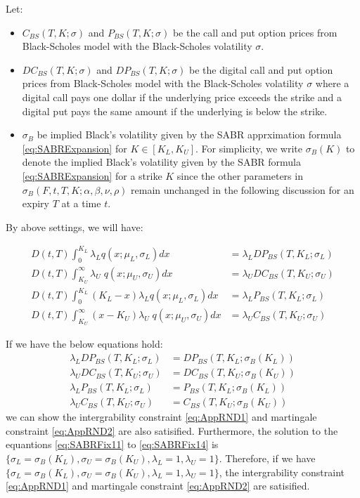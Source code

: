 \documentclass[letterpaper,12pt,titlepage,oneside,final]{book}
\numberwithin{equation}{section}
\theoremstyle{definition}
\begin{document}
Let:
\begin{itemize}
\item  $C_{BS}(T,K;\sigma)$ and $P_{BS}(T,K;\sigma)$ be the call and put option prices from Black-Scholes model with the Black-Scholes volatility $\sigma$.
\item  $DC_{BS}(T,K;\sigma)$ and $DP_{BS}(T,K;\sigma)$ be the digital call and put option prices from Black-Scholes model with the Black-Scholes  volatility $\sigma$  where a digital call pays one dollar if the underlying price exceeds the strike and a digital put pays the same amount  if the underlying is below the strike. 
\item  $\sigma_B$ be implied Black's volatility given by the SABR apprximation formula \eqref{eq:SABRExpansion} for $K \in [K_{L},K_{U}]$. For simplicity, we write $\sigma_{B}(K)$ to denote the implied Black's volatility given by the SABR formula \eqref{eq:SABRExpansion} for a strike $K$ since the other parameters in  $\sigma_{B}(F,t,T,K;\alpha,\beta,\nu,\rho)$ remain unchanged in the following discussion for an expiry $T$ at a time $t$.
 \end{itemize}

By above settings, we will have:

 \begin{align}
 D(t,T)\int_{0}^{K_{L}}	\lambda_{L}   q(x;\mu_{L},\sigma_{L}) dx&=\lambda_{L} DP_{BS}(T,K_{L};\sigma_{L}) \label{eq:SABRFix01} \\
 D(t,T)\int_{K_{U}}^{\infty}	 \lambda_{U} \;  q(x;\mu_{U},\sigma_{U}) dx&=\lambda_{U} DC_{BS}(T,K_{U};\sigma_{U}) \label{eq:SABRFix02}\\
 D(t,T)\int_{0}^{K_{L}} (K_L-x)	\lambda_{L}   q(x;\mu_{L},\sigma_{L}) dx&=\lambda_{L} P_{BS}(T,K_{L};\sigma_{L})\label{eq:SABRFix03} \\
 D(t,T)\int_{K_{U}}^{\infty}	(x-K_U) \lambda_{U} \;  q(x;\mu_{U},\sigma_{U}) dx&=\lambda_{U} C_{BS}(T,K_{U};\sigma_{U})\label{eq:SABRFix04} 
 \end{align}


If we have the below equations hold: 
\begin{align}
		 \lambda_L DP_{BS}(T,K_{L};\sigma_L)&=DP_{BS}(T,K_{L};\sigma_{B}(K_{L})) \label{eq:SABRFix11} \\
		 \lambda_U DC_{BS}(T,K_{U};\sigma_U)&=DC_{BS}(T,K_{U};\sigma_{B}(K_{U}))  \label{eq:SABRFix12}\\
		 \lambda_L P_{BS}(T,K_{L};\sigma_L)&=P_{BS}(T,K_{L};\sigma_{B}(K_{L})) \label{eq:SABRFix13}\\
		 \lambda_U C_{BS}(T,K_{U};\sigma_U)&=C_{BS}(T,K_{U};\sigma_{B}(K_{U}))
	 \label{eq:SABRFix14}
	\end{align}
 we can  show the  intergrability constraint \eqref{eq:AppRND1} and martingale  constraint \eqref{eq:AppRND2} are also satisified.  Furthermore, the solution to the equantions \eqref{eq:SABRFix11} to \eqref{eq:SABRFix14} is $\{\sigma_{L}=\sigma_{B}(K_L),\sigma_{U}=\sigma_{B}(K_U), \lambda_{L}=1, \lambda_{U}=1\}$. Therefore, if we have $\{\sigma_{L}=\sigma_{B}(K_L),\sigma_{U}=\sigma_{B}(K_U), \lambda_{L}=1, \lambda_{U}=1\}$, the intergrability constraint \eqref{eq:AppRND1} and martingale  constraint \eqref{eq:AppRND2} are satisified. 
 
\end{document}
